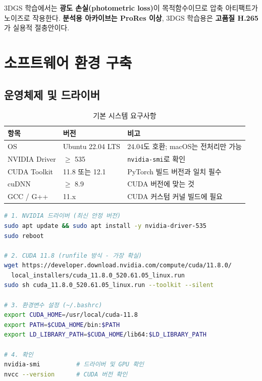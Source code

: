 \documentclass[11pt, a4paper]{report}
\begin{document}
\begin{importantnote}
3DGS 학습에서는 \textbf{광도 손실(photometric loss)}이 목적함수이므로
압축 아티팩트가 노이즈로 작용한다.
\textbf{분석용 아카이브는 ProRes 이상}, 3DGS 학습용은 \textbf{고품질 H.265}가 실용적 절충안이다.
\end{importantnote}


\chapter{소프트웨어 환경 구축}
\label{ch:software}

\section{운영체제 및 드라이버}

\begin{table}[H]
\centering
\caption{기본 시스템 요구사항}
\label{tab:system_req}
\renewcommand{\arraystretch}{1.3}
\begin{tabular}{lll}
\toprule
\textbf{항목} & \textbf{버전} & \textbf{비고} \\
\midrule
OS & Ubuntu 22.04 LTS & 24.04도 호환; macOS는 전처리만 가능 \\
NVIDIA Driver & $\geq$ 535 & \texttt{nvidia-smi}로 확인 \\
CUDA Toolkit & 11.8 또는 12.1 & PyTorch 빌드 버전과 일치 필수 \\
cuDNN & $\geq$ 8.9 & CUDA 버전에 맞는 것 \\
GCC / G++ & 11.x & CUDA 커스텀 커널 빌드에 필요 \\
\bottomrule
\end{tabular}
\end{table}

\begin{termbox}[title={NVIDIA 드라이버 + CUDA 설치}]
\begin{lstlisting}[language=bash, numbers=none]
# 1. NVIDIA 드라이버 (최신 안정 버전)
sudo apt update && sudo apt install -y nvidia-driver-535
sudo reboot

# 2. CUDA 11.8 (runfile 방식 - 가장 확실)
wget https://developer.download.nvidia.com/compute/cuda/11.8.0/
  local_installers/cuda_11.8.0_520.61.05_linux.run
sudo sh cuda_11.8.0_520.61.05_linux.run --toolkit --silent

# 3. 환경변수 설정 (~/.bashrc)
export CUDA_HOME=/usr/local/cuda-11.8
export PATH=$CUDA_HOME/bin:$PATH
export LD_LIBRARY_PATH=$CUDA_HOME/lib64:$LD_LIBRARY_PATH

# 4. 확인
nvidia-smi          # 드라이버 및 GPU 확인
nvcc --version      # CUDA 버전 확인
\end{lstlisting}
\end{termbox}
\end{document}
